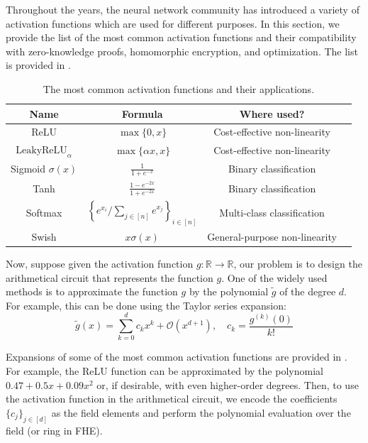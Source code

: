 \documentclass[12pt,a4paper,oneside]{book}
\theoremstyle{dplplain}
\theoremstyle{dpldefinition}
\theoremstyle{dplremark}
\begin{document}
Throughout the years, the neural network community has introduced a variety of
activation functions which are used for different purposes. In this section, we
provide the list of the most common activation functions and their compatibility
with zero-knowledge proofs, homomorphic encryption, and optimization. The list
is provided in .

\begin{table}[H]
    \centering
    \begin{tabular}{cccc}
        \hline
        \textbf{Name} & \textbf{Formula} & \textbf{Where used?} \\
        \hline
        ReLU & $\max\{0,x\}$ & Cost-effective non-linearity \\
        $\text{LeakyReLU}_{\alpha}$ & $\max\{\alpha x,x\}$ & Cost-effective non-linearity \\
        Sigmoid $\sigma(x)$ & $\frac{1}{1+e^{-x}}$ & Binary classification \\
        Tanh & $\frac{1-e^{-2x}}{1+e^{-2x}}$ & Binary classification \\
        Softmax & $\left\{e^{x_i}/\sum_{j\in [n]}e^{x_j}\right\}_{i \in [n]}$ & Multi-class classification \\
        Swish & $x\sigma(x)$ & General-purpose non-linearity \\
        \hline
    \end{tabular}
    \caption{The most common activation functions and their applications.}
    \label{table:activations}
\end{table}

Now, suppose given the activation function $g: \mathbb{R} \to \mathbb{R}$, 
our problem is to design the arithmetical circuit that represents the function
$g$. One of the widely used methods is to approximate the function $g$ by the
polynomial $\widetilde{g}$ of the degree $d$. For example, this can be done using 
the Taylor series expansion:
\begin{equation*}
    \widetilde{g}(x) = \sum_{k=0}^d c_k x^k + \mathcal{O}(x^{d+1}), \quad c_k = \frac{g^{(k)}(0)}{k!}
\end{equation*}

Expansions of some of the most common activation functions are provided in
. For example, the ReLU function can be approximated by
the polynomial $0.47 + 0.5x + 0.09x^2$ or, if desirable, with even higher-order 
degrees. Then, to use the activation function in the arithmetical circuit, we
encode the coefficients $\{c_j\}_{j \in [d]}$ as the field elements and 
perform the polynomial evaluation over the field (or ring in FHE). 
\end{document}
